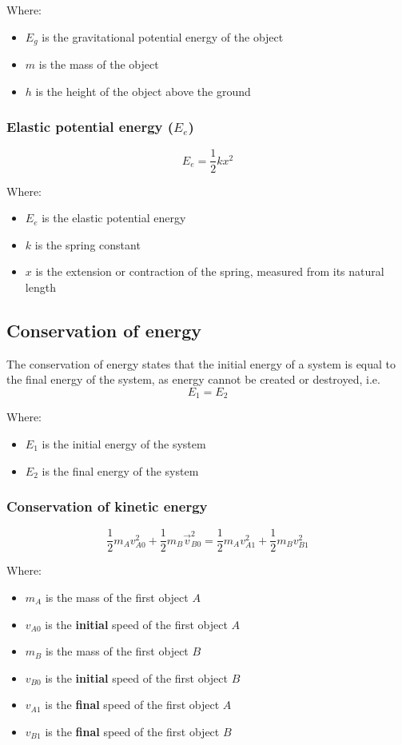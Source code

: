 \documentclass[11pt]{article}
\begin{document}
Where:
\begin{itemize}
\item \(E_g\) is the gravitational potential energy of the object
\item \(m\) is the mass of the object
\item \(h\) is the height of the object above the ground
\end{itemize}

\subsubsection{Elastic potential energy (\(E_e\))}
\label{sec:orgd89f960}
\[E_e = \frac{1}{2} kx^2\]

Where:
\begin{itemize}
\item \(E_e\) is the elastic potential energy
\item \(k\) is the spring constant
\item \(x\) is the extension or contraction of the spring, measured from its natural length
\end{itemize}

\subsection{Conservation of energy}
\label{sec:org52000cf}
The conservation of energy states that the initial energy of a system is equal to the final energy of the system, as energy cannot be created or destroyed, i.e.
\[E_1 = E_2\]

Where:
\begin{itemize}
\item \(E_1\) is the initial energy of the system
\item \(E_2\) is the final energy of the system
\end{itemize}

\subsubsection{Conservation of kinetic energy}
\label{sec:org7375bb6}
\[\frac{1}{2} m_A v_{A0}^2 + \frac{1}{2} m_B \vec{v}_{B0}^2 = \frac{1}{2} m_A v_{A1}^2 + \frac{1}{2} m_B v_{B1}^2\]

Where:
\begin{itemize}
\item \(m_A\) is the mass of the first object \(A\)
\item \(v_{A0}\) is the \textbf{initial} speed of the first object \(A\)
\item \(m_B\) is the mass of the first object \(B\)
\item \(v_{B0}\) is the \textbf{initial} speed of the first object \(B\)
\item \(v_{A1}\) is the \textbf{final} speed of the first object \(A\)
\item \(v_{B1}\) is the \textbf{final} speed of the first object \(B\)
\end{itemize}
\end{document}
